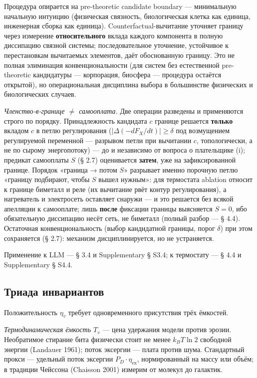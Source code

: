 \documentclass[pdflatex,sn-mathphys-ay]{sn-jnl}
\begin{document}
Процедура опирается на pre-theoretic candidate boundary --- минимальную начальную интуицию (физическая связность, биологическая клетка как единица, инженерная сборка как единица). Counterfactual-вычитание уточняет границу через измерение \textbf{относительного} вклада каждого компонента в полную диссипацию связной системы; последовательное уточнение, устойчивое к перестановкам вычитаемых элементов, даёт обоснованную границу. Это не полная элиминация конвенциональности (для систем без естественной pre-theoretic кандидатуры --- корпорация, биосфера --- процедура остаётся открытой), но операциональная дисциплина выбора в большинстве физических и биологических случаев.

\emph{Членство-в-границе \ensuremath{\ne} самооплата.} Две операции разведены и применяются строго по порядку. Принадлежность кандидата \(c\) границе решается \textbf{только} вкладом \(c\) в петлю регулирования (\(|\Delta(-dF_X/dt)| \ge \delta\) под возмущением регулируемой переменной --- разрывом петли при вычитании \(c\), топологически, а не по сырому энергопотоку) --- до и независимо от вопроса о плательщике (i); предикат самооплаты \(S\) (§ 2.7) оценивается \textbf{затем}, уже на зафиксированной границе. Порядок «граница → потом \(S\)» разрывает именно порочную петлю «границу подбирают, чтобы \(S\) вышел нужным»: для термостата ablation относит к границе биметалл и реле (их вычитание рвёт контур регулирования), а нагреватель и электросеть оставляет снаружи --- и это решается без всякой апелляции к самооплате; лишь \textbf{после} фиксации границы выясняется \(S = 0\), ибо обязательную диссипацию несёт сеть, не биметалл (полный разбор --- § 4.4). Остаточная конвенциональность (выбор кандидатной границы, порог \(\delta\)) при этом сохраняется (§ 2.7): механизм дисциплинируется, но не устраняется.

Применение к LLM --- § 3.4 и Supplementary § S3.4; к термостату --- § 4.4 и Supplementary § S4.4.

\subsection{Триада инвариантов}\label{ux442ux440ux438ux430ux434ux430-ux438ux43dux432ux430ux440ux438ux430ux43dux442ux43eux432}

Положительность \(\eta_v\) требует одновременного присутствия трёх ёмкостей.

\emph{Термодинамическая ёмкость \(T_v\)} --- цена удержания модели против эрозии. Необратимое стирание бита физически стоит не менее \(k_B T \ln 2\) свободной энергии (Landauer 1961); поток эксергии --- плата против шума. Стандартный прокси --- удельный поток эксергии \(P_D \cdot \eta_{\text{ex}}\), нормированный на массу или объём; в традиции Чейссона (Chaisson 2001) измерим от молекул до галактик.
\end{document}
